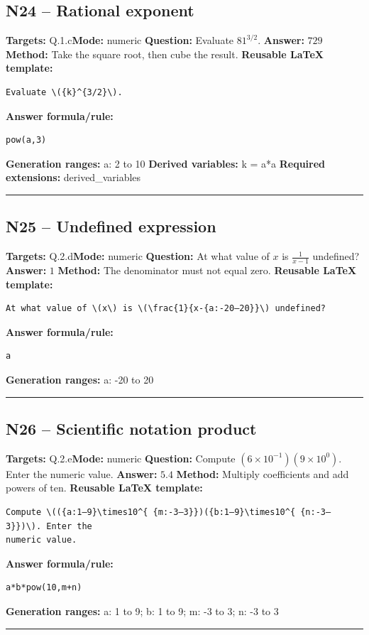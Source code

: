 \documentclass[11pt]{article}
\begin{document}
\subsection{N24 -- Rational exponent}
\textbf{Targets:} Q.1.c\quad\textbf{Mode:} numeric
\textbf{Question:} Evaluate \(81^{3/2}\).
\textbf{Answer:} \(729\)
\textbf{Method:} Take the square root, then cube the result.
\textbf{Reusable LaTeX template:}
\begin{verbatim}
Evaluate \({k}^{3/2}\).
\end{verbatim}
\textbf{Answer formula/rule:}
\begin{verbatim}
pow(a,3)
\end{verbatim}
\textbf{Generation ranges:} a: 2 to 10
\textbf{Derived variables:} k = a*a
\textbf{Required extensions:} derived\_variables
\medskip\hrule\medskip
\subsection{N25 -- Undefined expression}
\textbf{Targets:} Q.2.d\quad\textbf{Mode:} numeric
\textbf{Question:} At what value of \(x\) is \(\frac{1}{x-1}\) undefined?
\textbf{Answer:} \(1\)
\textbf{Method:} The denominator must not equal zero.
\textbf{Reusable LaTeX template:}
\begin{verbatim}
At what value of \(x\) is \(\frac{1}{x-{a:-20–20}}\) undefined?
\end{verbatim}
\textbf{Answer formula/rule:}
\begin{verbatim}
a
\end{verbatim}
\textbf{Generation ranges:} a: -20 to 20
\medskip\hrule\medskip
\subsection{N26 -- Scientific notation product}
\textbf{Targets:} Q.2.e\quad\textbf{Mode:} numeric
\textbf{Question:} Compute \((6\times10^{ -1})(9\times10^{ 0})\). Enter the numeric value.
\textbf{Answer:} \(5.4\)
\textbf{Method:} Multiply coefficients and add powers of ten.
\textbf{Reusable LaTeX template:}
\begin{verbatim}
Compute \(({a:1–9}\times10^{ {m:-3–3}})({b:1–9}\times10^{ {n:-3–3}})\). Enter the
numeric value.
\end{verbatim}
\textbf{Answer formula/rule:}
\begin{verbatim}
a*b*pow(10,m+n)
\end{verbatim}
\textbf{Generation ranges:} a: 1 to 9; b: 1 to 9; m: -3 to 3; n: -3 to 3
\medskip\hrule\medskip
\end{document}
